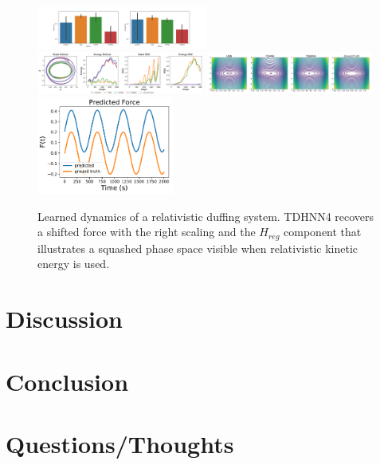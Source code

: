 \documentclass[twoside]{article}
\begin{document}
\begin{figure}[h!]
\centering
\includegraphics[width=0.5\textwidth]{figures/relativity_1_errors.pdf}
\includegraphics[width=0.49\textwidth]{figures/relativity_1_pred.pdf}
\includegraphics[width=0.49\textwidth]{figures/relativity_1_true.pdf}
\includegraphics[width=0.4\textwidth]{figures/relativity_force_1.pdf}
\caption{Learned dynamics of a relativistic duffing system. TDHNN4 recovers a shifted force with the right scaling and the $H_{reg}$ component that illustrates a squashed phase space visible when relativistic kinetic energy is used.}
\end{figure}


\section{Discussion}


\section{Conclusion}

\section{Questions/Thoughts}
\end{document}
